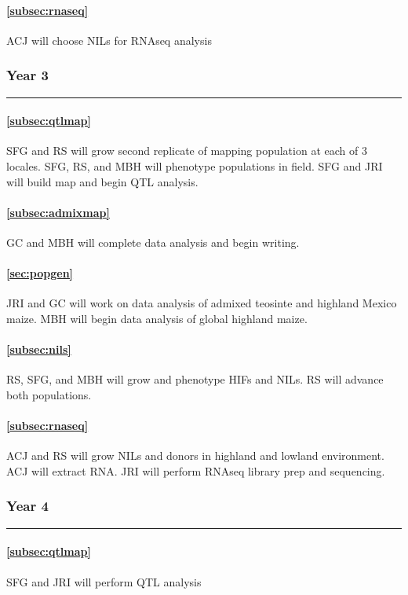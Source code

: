 \paragraph{ \bf   \ref{subsec:rnaseq}} ACJ will choose NILs for RNAseq analysis

\subsubsection*{Year 3} \hrule \vspace{0.1cm}

\paragraph{  \bf \ref{subsec:qtlmap}} SFG and RS will grow second replicate of mapping population at each of 3 locales.  SFG, RS, and MBH will phenotype populations in field. SFG and JRI will build map and begin QTL analysis.
\paragraph{  \bf  \ref{subsec:admixmap}} GC and MBH will complete data analysis and begin writing.
\paragraph{  \bf  \ref{sec:popgen}} JRI and GC will work on data analysis of admixed teosinte and highland Mexico maize. MBH will begin data analysis of global highland maize.
\paragraph{ \bf \ref{subsec:nils}} RS, SFG, and MBH will grow and phenotype HIFs and NILs. RS will advance both populations.
\paragraph{ \bf   \ref{subsec:rnaseq}} ACJ and RS will grow NILs and donors in highland and lowland environment.  ACJ will extract RNA. JRI will perform RNAseq library prep and sequencing.

\subsubsection*{Year 4} \hrule \vspace{0.1cm}

\paragraph{  \bf \ref{subsec:qtlmap}} SFG and JRI will perform QTL analysis
